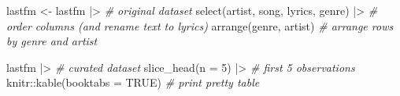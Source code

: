 \documentclass[
  letterpaper,
]{scrbook}
\newenvironment{Shaded}{\begin{snugshade}}{\end{snugshade}}
\newcommand{\AttributeTok}[1]{\textcolor[rgb]{0.00,0.00,0.00}{#1}}
\newcommand{\CommentTok}[1]{\textcolor[rgb]{0.00,0.00,0.00}{\textit{#1}}}
\newcommand{\ConstantTok}[1]{\textcolor[rgb]{0.00,0.00,0.00}{#1}}
\newcommand{\DecValTok}[1]{\textcolor[rgb]{0.00,0.00,0.00}{#1}}
\newcommand{\FunctionTok}[1]{\textcolor[rgb]{0.00,0.00,0.00}{#1}}
\newcommand{\NormalTok}[1]{\textcolor[rgb]{0.00,0.00,0.00}{#1}}
\newcommand{\OtherTok}[1]{\textcolor[rgb]{0.00,0.00,0.00}{#1}}
\newcommand{\SpecialCharTok}[1]{\textcolor[rgb]{0.00,0.00,0.00}{#1}}
\begin{document}
\begin{Shaded}
\begin{Highlighting}[]
\NormalTok{lastfm }\OtherTok{\textless{}{-}} 
\NormalTok{  lastfm }\SpecialCharTok{|\textgreater{}} \CommentTok{\# original dataset}
  \FunctionTok{select}\NormalTok{(artist, song, lyrics, genre) }\SpecialCharTok{|\textgreater{}} \CommentTok{\# order columns (and rename \textasciigrave{}text\textasciigrave{} to \textasciigrave{}lyrics\textasciigrave{})}
  \FunctionTok{arrange}\NormalTok{(genre, artist) }\CommentTok{\# arrange rows by \textasciigrave{}genre\textasciigrave{} and \textasciigrave{}artist\textasciigrave{}}

\NormalTok{lastfm }\SpecialCharTok{|\textgreater{}} \CommentTok{\# curated dataset}
  \FunctionTok{slice\_head}\NormalTok{(}\AttributeTok{n =} \DecValTok{5}\NormalTok{) }\SpecialCharTok{|\textgreater{}} \CommentTok{\# first 5 observations}
\NormalTok{  knitr}\SpecialCharTok{::}\FunctionTok{kable}\NormalTok{(}\AttributeTok{booktabs =} \ConstantTok{TRUE}\NormalTok{) }\CommentTok{\# print pretty table}
\end{Highlighting}
\end{Shaded}
\end{document}
